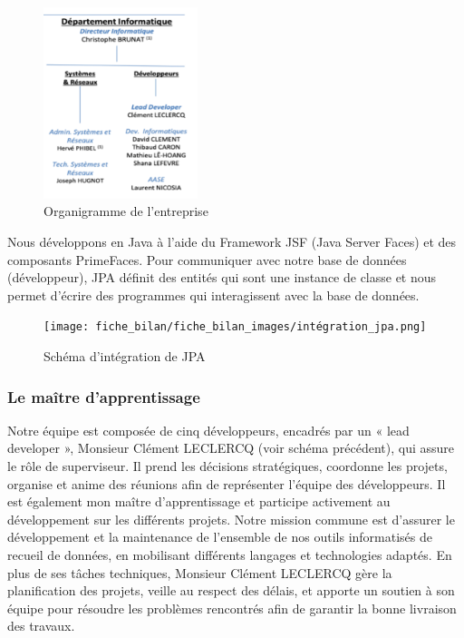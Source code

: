 \begin{figure}[H]
    \centering
    \includegraphics[width=0.4\textwidth]{fiche_bilan/fiche_bilan_images/organigramme_info.png} 
    \caption{Organigramme de l'entreprise}
\end{figure}
Nous développons en Java à l’aide du Framework JSF (Java Server Faces) et
des composants PrimeFaces.
Pour communiquer avec notre base de données (développeur), JPA définit des
entités qui sont une instance de classe et nous permet d’écrire des
programmes qui interagissent avec la base de données.
\begin{figure}[H]
    \centering
    \texttt{[image: fiche\_bilan/fiche\_bilan\_images/intégration\_jpa.png]} 
    \caption{Schéma d'intégration de JPA}
\end{figure}

\subsubsection{Le maître d'apprentissage}
Notre équipe est composée de cinq développeurs, encadrés par un « lead developer », Monsieur Clément LECLERCQ (voir schéma précédent), qui assure le rôle de superviseur. Il prend les décisions stratégiques, coordonne les projets, organise et anime des réunions afin de représenter l’équipe des développeurs. Il est également mon maître d’apprentissage et participe activement au développement sur les différents projets.
Notre mission commune est d’assurer le développement et la maintenance de l’ensemble de nos outils informatisés de recueil de données, en mobilisant différents langages et technologies adaptés. En plus de ses tâches techniques, Monsieur Clément LECLERCQ gère la planification des projets, veille au respect des délais, et apporte un soutien à son équipe pour résoudre les problèmes rencontrés afin de garantir la bonne livraison des travaux.

